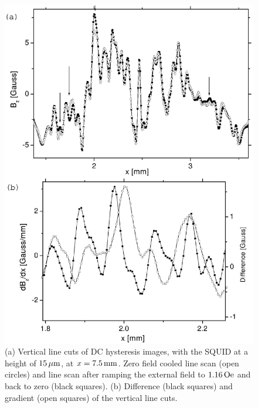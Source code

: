 \begin{figure}[p]
\includegraphics[width=5.7in]{figs/magpen/dclineclose.ps}
\caption[Before and after line cuts of DC hysteresis 
images at a height of $15\,\micron$.]
{(a) 
Vertical line cuts of DC hysteresis images, with the SQUID at a height of
$15\,\micron$, at $x=7.5\,\mathrm{mm}$. 
Zero field cooled line scan (open circles) and line scan after 
ramping the external field to $1.16\,\mathrm{Oe}$ and back to zero
(black squares). 
(b) Difference (black squares) and gradient (open squares) of the
vertical line cuts.
}
\label{fig:dc_hist_cuts_low_a}
\label{fig:dc_hist_cuts_low_b}
\end{figure}


%
%

